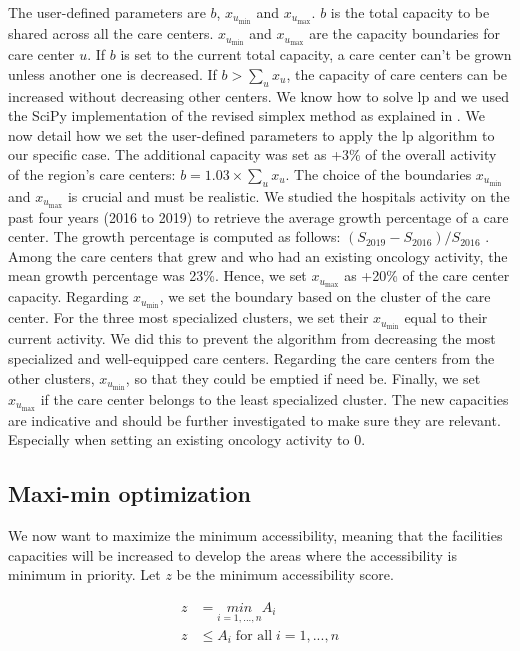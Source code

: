 The user-defined parameters are $b$, $x_{u_\text{min}}$ and $x_{u_\text{max}}$.
$b$ is the total capacity to be shared across all the care centers.
$x_{u_\text{min}}$ and $x_{u_\text{max}}$ are the capacity boundaries for care
center $u$. If $b$ is set to the current total capacity, a care center can’t be
grown unless another one is decreased. If $b > \sum_{u} x_u$, the capacity of
care centers can be increased without decreasing other centers. We know how to
solve \ac{lp} and we used the SciPy \cite{virtanen_scipy_2020} implementation of
the revised simplex method as explained in \cite{bertsimas_introduction_1998}.
We now detail how we set the user-defined parameters to apply the \ac{lp}
algorithm to our specific case. The additional capacity was set as +3\% of the
overall activity of the region's care centers: $b = 1.03 \times \sum_{u} x_u$.
The choice of the boundaries $x_{u_\text{min}}$  and $x_{u_\text{max}}$ is
crucial and must be realistic. We studied the hospitals activity on the past
four years (2016 to 2019) to retrieve the average growth percentage of a care
center. The growth percentage is computed as follows: $(S_\text{2019} -
    S_\text{2016}) / S_\text{2016}$ . Among the care centers that grew and who had
an existing oncology activity, the mean growth percentage was 23\%. Hence, we
set $x_{u_\text{max}}$ as +20\% of the care center capacity. Regarding
$x_{u_\text{min}}$, we set the boundary based on the cluster of the care center.
For the three most specialized clusters, we set their $x_{u_\text{min}}$ equal
to their current activity. We did this to prevent the algorithm from decreasing
the most specialized and well-equipped care centers. Regarding the care centers
from the other clusters, $x_{u_\text{min}}$, so that they could be emptied if
need be. Finally, we set $x_{u_\text{max}}$ if the care center belongs to the
least specialized cluster. The new capacities are indicative and should be
further investigated to make sure they are relevant. Especially when setting an
existing oncology activity to 0.

\subsection{Maxi-min optimization}

We now want to maximize the minimum accessibility, meaning that the facilities
capacities will be increased to develop the areas where the accessibility is
minimum in priority. Let $z$ be the minimum accessibility score.

\begin{align}
    z & = \underset{i=1, ..., n}{min} A_i       \\
    z & \leq A_i \; \text{for all} \; i=1,...,n
    \label{eq:z-inequality}
\end{align}

